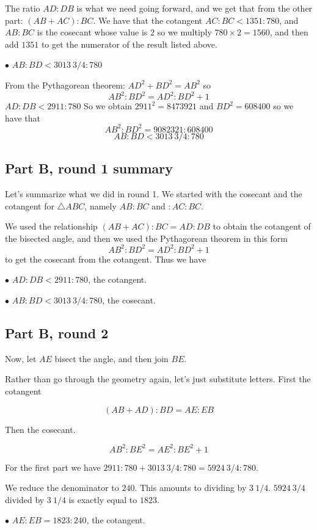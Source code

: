 \documentclass[11pt, oneside]{article}
\begin{document}
The ratio $AD:DB$ is what we need going forward, and we get that from the other part:  $(AB + AC):BC$.  We have that the cotangent $AC : BC < 1351 : 780$, and $AB:BC$ is the cosecant whose value is $2$ so we multiply $780 \times 2 = 1560$, and then add $1351$ to get the numerator of the result listed above.

$\bullet$  $AB : BD < 3013 \ 3/4 : 780$

From the Pythagorean theorem:  $AD^2 + BD^2 = AB^2$ so
\[ AB^2:BD^2 = AD^2:BD^2 + 1 \]
$AD : DB < 2911 : 780$  So we obtain $2911^2 = 8473921$ and $BD^2 = 608400$ so we have that
\[ AB^2:BD^2 =  9082321: 608400 \]
\[ AB:BD <  3013 \ 3/4: 780 \]

\subsection*{Part B, round 1 summary}
Let's summarize what we did in round 1.  We started with the cosecant and the cotangent for $\triangle ABC$, namely $AB:BC$ and $:AC:BC$.

We used the relationship $(AB + AC):BC = AD:DB$ to obtain the cotangent of the bisected angle, and then we used the Pythagorean theorem in this form
\[ AB^2:BD^2 = AD^2:BD^2 + 1 \]
to get the cosecant from the cotangent.  Thus we have

$\bullet$  $AD : DB < 2911 : 780$, the cotangent.

$\bullet$  $AB : BD < 3013 \ 3/4 : 780$, the cosecant.

\subsection*{Part B, round 2}

Now, let $AE$ bisect the angle, and then join $BE$.

Rather than go through the geometry again, let's just substitute letters.  First the cotangent

\[ (AB + AD):BD = AE:EB \]

Then the cosecant.

\[ AB^2:BE^2 = AE^2:BE^2 + 1 \]

For the first part we have $2911:780 + 3013 \ 3/4:780 = 5924 \ 3/4:780$.  

We reduce the denominator to $240$.  This amounts to dividing by $3 \ 1/4$.  $5924 \ 3/4$ divided by $3 \ 1/4$ is exactly equal to $1823$.

$\bullet$ $AE:EB = 1823:240$, the cotangent.
\end{document}
